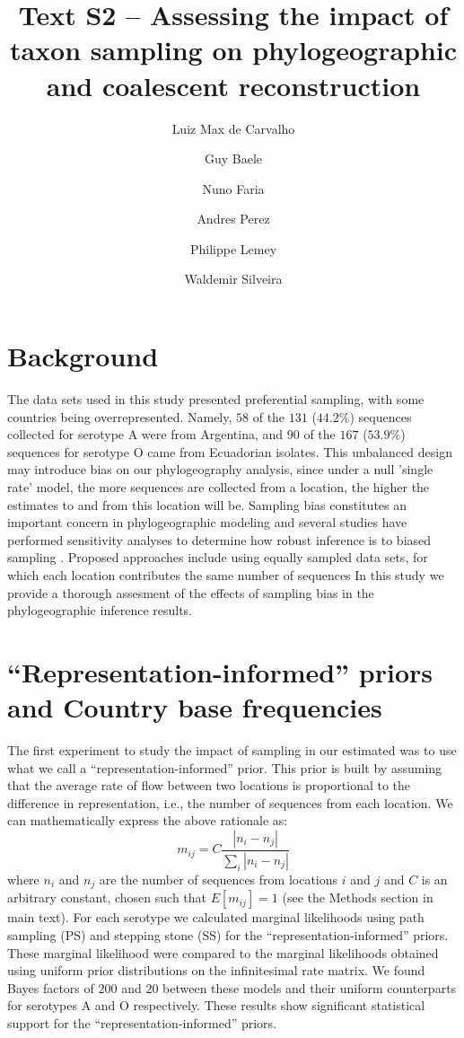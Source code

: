 \documentclass[a4paper,10pt]{article}
\title{Text S2 -- Assessing the impact of taxon sampling on phylogeographic and coalescent reconstruction} %
\author{
Luiz Max de Carvalho \\
\and Guy Baele\\
\and Nuno Faria \\
\and Andres Perez \\
\and Philippe Lemey \\
\and Waldemir Silveira 
}
\date{}
\begin{document}
\maketitle

\section{Background}
The data sets used in this study presented preferential sampling, with some countries being overrepresented.
Namely, $58$ of the $131$ ($44.2\%$) sequences collected for serotype A were from Argentina, and $90$ of the $167$ ($53.9\%$) sequences for serotype O came from Ecuadorian isolates.
This unbalanced design may introduce bias on our phylogeography analysis, since under a null 'single rate' model, the more sequences are collected from a location, the higher the estimates to and from this location will be. %
Sampling bias constitutes an important concern in phylogeographic modeling and several studies have performed sensitivity analyses to determine how robust inference is to biased sampling \cite{Faria2012,Lemey2013,polar,fluPNAS}.
Proposed approaches include using equally sampled data sets, for which each location contributes the same number of sequences \cite{fluPNAS} 
In this study we provide a thorough assesment of the effects of sampling bias in the phylogeographic inference results. 
\section{``Representation-informed'' priors and Country base frequencies}
The first experiment to study the impact of sampling in our estimated was to use what we call a ``representation-informed'' prior.
This prior is built by assuming that the average rate of flow between two locations is proportional to the difference in representation, i.e., the number of sequences from each location.
We can mathematically express the above rationale as:
\begin{equation}
 m_{ij}=C\frac{|n_i-n_j|}{\sum_i|n_i-n_j|}
\end{equation}
where $n_i$ and $n_j$ are the number of sequences from locations $i$ and $j$ and $C$ is an arbitrary constant, chosen such that $E[m_{ij}]=1$ (see the Methods section in main text).
For each serotype we calculated marginal likelihoods using path sampling (PS) and stepping stone (SS) for the ``representation-informed'' priors.
These marginal likelihood were compared to the marginal likelihoods obtained using uniform prior distributions on the infinitesimal rate matrix.
We found Bayes factors of $200$ and $20$ between these models and their uniform counterparts for serotypes A and O respectively.
These results show significant statistical support for the ``representation-informed'' priors.
\end{document}
